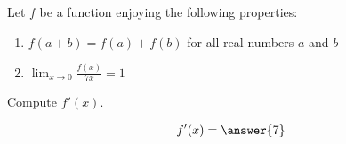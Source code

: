\documentclass{ximera}
\author{Steven Gubkin}
\begin{document}
\begin{exercise}



Let $f$ be a function enjoying the following properties:

\begin{enumerate}
\item $f(a+b) = f(a)+f(b)$ for all real numbers $a$ and $b$
\item $\lim_{x \to 0} \frac{f(x)}{7x} = 1$
\end{enumerate}

Compute $f'(x)$.

\begin{prompt}
	
	\[
	f'(x) = \answer{7}
	\]
\end{prompt}

\end{exercise}
\end{document}
